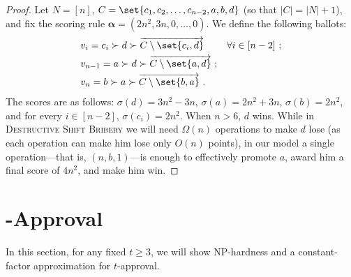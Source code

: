 \documentclass[letterpaper]{article} %
\newcommand{\vecgreek}{\bm}
\newcommand{\veca}{\vecgreek{\alpha}}
\newcommand{\shiftB}{\textsc{Shift Bribery}}
\newcommand{\DshiftB}{\textsc{Destructive} \shiftB{}}
\newcommand{\ora}[1]{\overrightarrow{#1}}
\newcommand{\abs}[1]{\lvert{#1}\rvert}
\newcommand{\NP}{\mathrm{NP}}
\begin{document}
\begin{proof}
Let $N = [n]$, $C = \set{c_1, c_2, \dots, c_{n-2}, a,b, d}$    (so that $\abs{C} = \abs{N}+1 $), and fix the  scoring rule $\veca=(2n^2, 3n,0,\ldots,0)$. We define the following ballots:
\begin{align*}
&v_i = c_i \succ d \succ \ora{C\setminus \set{c_i, d}} &\forall i \in  [n-2]\ ;\\
&v_{n-1} = a \succ d \succ \ora{C\setminus \set{a, d}}\ ;\\
&v_{n} = b \succ a \succ \ora{C\setminus \set{b,a}}\ .
\end{align*}
The scores are as follows: $\sigma(d) = 3n^2 -3n$, $\sigma(a) = 2n^2 + 3n$, $\sigma(b) = 2n^2$,  and for every $i \in  [n-2]$, $\sigma(c_i) = 2n^2$. When $n > 6$, $d$ wins. While in \DshiftB{} we will need $\Omega(n)$ operations to make $d$ lose (as each operation can make him lose only $O(n)$ points), in our model a single operation---that is, $(n, b, 1)$---is enough to effectively promote $a$, award him a final score of $4n^2$, and make him win.
\end{proof}
\section{-Approval}
In this section, for any fixed $t \geq 3$, we will show $\NP$-hardness and a constant-factor approximation for $t$-approval.
\end{document}
